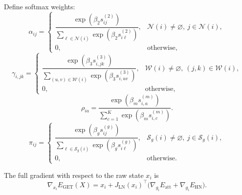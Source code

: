 \documentclass[11pt,a4paper]{article}
\begin{document}
Define softmax weights:
\begin{equation}
  \alpha_{ij}
  =
  \begin{cases}
    \dfrac{\exp(\beta_2 s^{(2)}_{ij})}
          {\sum_{\ell \in \mathcal{N}(i)} \exp(\beta_2 s^{(2)}_{i\ell})},
      & \mathcal{N}(i)\neq\varnothing,\ j \in \mathcal{N}(i), \\[1em]
    0, & \text{otherwise,}
  \end{cases}
\end{equation}
\begin{equation}
  \gamma_{i,jk}
  =
  \begin{cases}
    \dfrac{\exp(\beta_3 s^{(3)}_{i,jk})}
          {\sum_{(u,v) \in \mathcal{W}(i)} \exp(\beta_3 s^{(3)}_{i,uv})},
      & \mathcal{W}(i)\neq\varnothing,\ (j,k)\in\mathcal{W}(i), \\[1em]
    0, & \text{otherwise,}
  \end{cases}
\end{equation}
\begin{equation}
  \rho_{ia}
  = \frac{\exp(\beta_m s^{(m)}_{i,a})}
         {\sum_{c=1}^{K} \exp(\beta_m s^{(m)}_{i,c})}.
\end{equation}
\begin{equation}
  \pi_{ij}
  =
  \begin{cases}
    \dfrac{\exp(\beta_g s^{(g)}_{ij})}
          {\sum_{\ell \in \mathcal{S}_g(i)} \exp(\beta_g s^{(g)}_{i\ell})},
      & \mathcal{S}_g(i)\neq\varnothing,\ j \in \mathcal{S}_g(i), \\[1em]
    0, & \text{otherwise.}
  \end{cases}
\end{equation}

The full gradient with respect to the raw state $x_i$ is
\begin{equation}
  \nabla_{x_i} E_{\mathrm{GET}}(X)
  = x_i + {J_{\mathrm{LN}}(x_i)}^\top
    \bigl(\nabla_{g_i} E_{\mathrm{att}} + \nabla_{g_i} E_{\mathrm{HN}}\bigr).
\end{equation}
\end{document}
